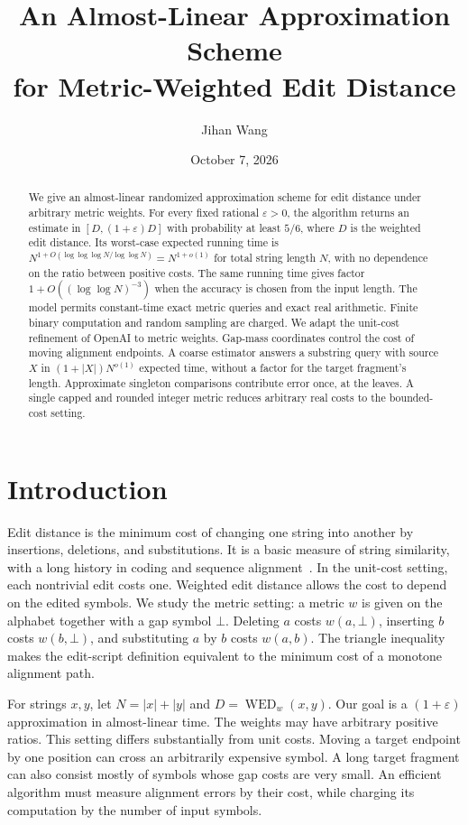 \documentclass[11pt]{article}
\title{An Almost-Linear Approximation Scheme\\for Metric-Weighted Edit Distance}
\author{Jihan Wang}
\date{October 7, 2026}
\theoremstyle{definition}
\newcommand{\WED}{\operatorname{WED}}
\newcommand{\gap}{\bot}
\newcommand{\1}{\mathbf 1}
\begin{document}
\maketitle
\begin{abstract}
We give an almost-linear randomized approximation scheme for edit
distance under arbitrary metric weights.
For every fixed rational $\varepsilon>0$, the algorithm returns an
estimate in $[D,(1+\varepsilon)D]$ with probability at least $5/6$,
where $D$ is the weighted edit distance.
Its worst-case expected running time is
$N^{1+O(\log\log\log N/\log\log N)}=N^{1+o(1)}$
for total string length $N$, with no dependence on the ratio between
positive costs.
The same running time gives factor $1+O((\log\log N)^{-3})$
when the accuracy is chosen from the input length.
The model permits constant-time exact metric queries and exact real
arithmetic. Finite binary computation and random sampling are charged.
We adapt the unit-cost refinement of OpenAI to metric weights.
Gap-mass coordinates control the cost of moving alignment endpoints.
A coarse estimator answers a substring query with source $X$ in
$(1+|X|)N^{o(1)}$ expected time, without a factor for the target
fragment's length. Approximate singleton comparisons contribute error
once, at the leaves. A single capped and rounded integer metric reduces
arbitrary real costs to the bounded-cost setting.
\end{abstract}

\section{Introduction}\label{paper:sec:introduction}

Edit distance is the minimum cost of changing one string into another by
insertions, deletions, and substitutions. It is a basic measure of string
similarity, with a long history in coding and sequence
alignment~\cite{Lev66,NW70,WF74,sellers1974}.
In the unit-cost setting, each nontrivial edit costs one.
Weighted edit distance allows the cost to depend on the edited symbols.
We study the metric setting: a metric $w$ is given on the alphabet
together with a gap symbol $\gap$. Deleting $a$ costs $w(a,\gap)$,
inserting $b$ costs $w(b,\gap)$, and substituting $a$ by $b$ costs $w(a,b)$.
The triangle inequality makes the edit-script definition equivalent to
the minimum cost of a monotone alignment path.

For strings $x,y$, let $N=|x|+|y|$ and $D=\WED_w(x,y)$.
Our goal is a $(1+\varepsilon)$ approximation in almost-linear time.
The weights may have arbitrary positive ratios.
This setting differs substantially from unit costs.
Moving a target endpoint by one position can cross an arbitrarily
expensive symbol. A long target fragment can also consist mostly of
symbols whose gap costs are very small.
An efficient algorithm must measure alignment errors by their cost,
while charging its computation by the number of input symbols.
\end{document}
